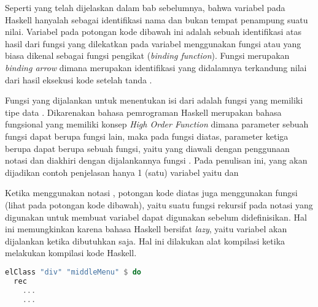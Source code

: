 \documentclass[pi.tex]{subfile}
\begin{document}
     \hspace{10pt}Seperti yang telah dijelaskan dalam bab sebelumnya, bahwa variabel pada Haskell hanyalah sebagai identifikasi nama dan bukan tempat penampung suatu nilai. Variabel  pada potongan kode dibawah ini adalah sebuah identifikasi atas hasil dari fungsi  yang dilekatkan pada variabel  menggunakan fungsi \fhaskell{($<$-)} atau yang biasa dikenal sebagai fungsi pengikat (\emph{binding function}). Fungsi \fhaskell{($<$- )} merupakan \emph{binding arrow} dimana  merupakan identifikasi yang didalamnya terkandung nilai dari hasil eksekusi kode setelah tanda \fhaskell{( $<$- )}.

     \hspace{10pt}Fungsi yang dijalankan untuk menentukan isi dari  adalah fungsi  yang memiliki tipe data . Dikarenakan bahasa pemrograman Haskell merupakan bahasa fungsional yang memiliki konsep \emph{High Order Function} dimana parameter sebuah fungsi dapat berupa fungsi lain, maka pada fungsi  diatas, parameter ketiga berupa  dapat berupa sebuah fungsi, yaitu yang diawali dengan penggunaan notasi  dan diakhiri dengan dijalankannya fungsi . Pada penulisan ini, yang akan dijadikan contoh penjelasan hanya 1 (satu) variabel yaitu  dan 

     \hspace{10pt}Ketika menggunakan notasi , potongan kode diatas juga menggunakan fungsi  (lihat pada potongan kode dibawah), yaitu suatu fungsi rekursif pada notasi  yang digunakan untuk membuat variabel dapat digunakan sebelum didefinisikan. Hal ini memungkinkan karena bahasa Haskell bersifat \emph{lazy}, yaitu variabel akan dijalankan ketika dibutuhkan saja. Hal ini dilakukan alat kompilasi ketika melakukan kompilasi kode Haskell.\\

\begin{lstlisting}[language=Haskell]
elClass "div" "middleMenu" $ do
  rec
    ...
    ...
\end{lstlisting}
\end{document}

